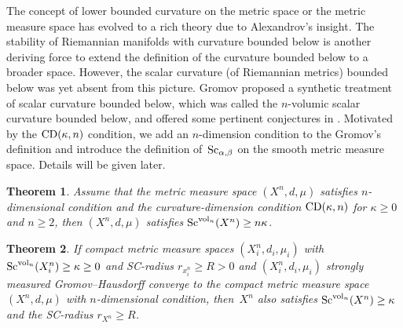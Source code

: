 \documentclass[pdftex]{sigma}
\newtheorem{Theorem}{Theorem}[section]
\begin{document}
The concept of lower bounded curvature on the metric space or the metric measure space has evolved to a rich theory due to Alexandrov's insight. The stability of Riemannian manifolds with curvature bounded below is another deriving force to extend the definition of the curvature bounded below to a broader space. However, the scalar curvature (of Riemannian metrics) bounded below was yet absent from this picture. Gromov proposed a synthetic treatment of scalar curvature bounded below, which was called the $n$-volumic scalar curvature bounded below, and offered some pertinent conjectures in \cite[Section~26]{Gromov}. Motivated by the ${\rm CD}(\kappa,n)$ condition, we add an $n$-dimension condition to the Gromov's definition and introduce the definition of~${\rm Sc}_{\alpha, \beta}$ on the smooth metric measure space. Details will be given later.

\begin{Theorem}Assume that the metric measure space $(X^n, d, \mu)$ satisfies $n$-dimensional condition and the curvature-dimension condition ${\rm CD}(\kappa, n)$ for $\kappa\geq 0$ and $n\geq 2$, then $(X^n, d, \mu)$ satisfies ${\rm Sc}^{{\rm vol}_n}(X^n)\geq n\kappa$.
\end{Theorem}

\begin{Theorem}
If compact metric measure spaces $(X_i^n, d_i, \mu_i)$ with ${\rm Sc}^{{\rm vol}_n}(X^n_i)\geq \kappa\geq 0$ and SC-radius $r_{x^n_i}\geq R>0$ and $(X_i^n, d_i, \mu_i)$ strongly measured Gromov--Hausdorff converge to the compact metric measure space $(X^n, d, \mu)$ with $n$-dimensional condition, then~$X^n$ also satisfies ${\rm Sc}^{{\rm vol}_n}(X^n)\geq \kappa$ and the SC-radius $r_{X^n}\geq R$.
\end{Theorem}
\end{document}
